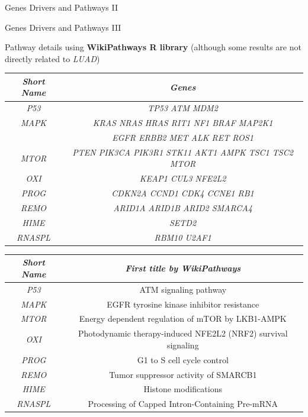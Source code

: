 \documentclass{beamer}
\begin{document}
\begin{frame}{Genes Drivers and Pathways II}
\begin{figure}
{    }%
  \end{figure}
\end{frame}
\begin{frame}{Genes Drivers and Pathways III}
  \begin{block}{Pathway details using \textbf{WikiPathways R library}
      \cite{wikipw} (although some results are not directly related to
      \textit{LUAD})} 
    \begin{table}[H]
      \footnotesize
      \centering
      {%
        \begin{tabular}{c||c}
          \textbf{\textit{Short Name}} &\textit{Genes} \\ 
          \hline
          \hline
          \textit{P53} & \textit{TP53 ATM MDM2}\\
          \hline
          \textit{MAPK} & \textit{KRAS   NRAS   HRAS   RIT1 NF1  BRAF MAP2K1}\\
                                       & \textit{EGFR ERBB2 MET ALK RET ROS1} \\ 
          \hline
          \textit{MTOR} & \textit{PTEN PIK3CA PIK3R1 STK11 AKT1 AMPK TSC1
                          TSC2 MTOR}  \\
          \hline
          \textit{OXI} & \textit{KEAP1  CUL3   NFE2L2}\\ 
          \hline
          \textit{PROG} & \textit{CDKN2A CCND1  CDK4   CCNE1  RB1}    \\
          \hline
          \textit{REMO} & \textit{ARID1A  ARID1B  ARID2   SMARCA4} \\
          \hline
          \textit{HIME} & \textit{SETD2} \\
          \hline
          \textit{RNASPL} & \textit{RBM10 U2AF1} \\
          
        \end{tabular}%
      } %
      {%
        \begin{tabular}{c||c}
          \textbf{\textit{Short Name}} &\textit{First title by WikiPathways} \\ 
          \hline
          \hline
          \textit{P53} & ATM signaling pathway\\
          \hline
          \textit{MAPK} & EGFR tyrosine kinase inhibitor resistance\\ 
          \hline
          \textit{MTOR} & Energy dependent regulation of mTOR by LKB1-AMPK \\
          \hline
          \textit{OXI} & Photodynamic therapy-induced NFE2L2 (NRF2) survival
                         signaling\\ 
          \hline
          \textit{PROG} & G1 to S cell cycle control \\
          \hline
          \textit{REMO} & Tumor suppressor activity of SMARCB1 \\
          \hline
          \textit{HIME} & Histone modifications \\
          \hline
          \textit{RNASPL} & Processing of Capped Intron-Containing Pre-mRNA \\
          

\end{tabular}}
\end{table}
\end{block}
\end{frame}
\end{document}
